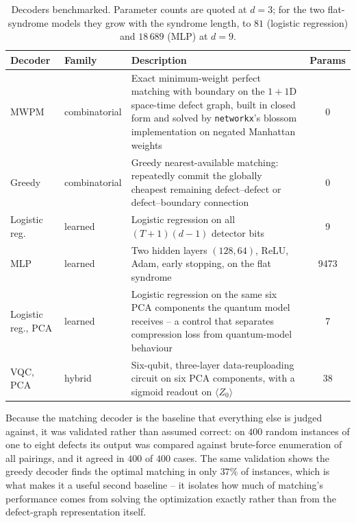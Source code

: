 \documentclass[Thesis.tex]{subfiles}
\begin{document}
\begin{table}[htbp]
\centering
\caption[Decoders benchmarked]{Decoders benchmarked. Parameter counts are quoted at $d = 3$; for the two
flat-syndrome models they grow with the syndrome length, to $81$ (logistic
regression) and $18\,689$ (MLP) at $d = 9$.}
\label{tab:ch6_decoders}
\small
\begin{tabular}{>{\raggedright\arraybackslash}p{2.6cm} >{\raggedright\arraybackslash}p{2.6cm} >{\raggedright\arraybackslash}p{6.7cm} c}
\toprule
\textbf{Decoder} & \textbf{Family} & \textbf{Description} & \textbf{Params} \\
\midrule
MWPM & combinatorial &
Exact minimum-weight perfect matching with boundary on the $1{+}1$D space-time
defect graph, built in closed form and solved by \texttt{networkx}'s blossom
implementation on negated Manhattan weights & 0 \\
\addlinespace
Greedy & combinatorial &
Greedy nearest-available matching: repeatedly commit the globally cheapest remaining
defect--defect or defect--boundary connection & 0 \\
\addlinespace
Logistic reg. & learned &
Logistic regression on all $(T{+}1)(d{-}1)$ detector bits & 9 \\
\addlinespace
MLP & learned &
Two hidden layers $(128, 64)$, ReLU, Adam, early stopping, on the flat syndrome & 9473 \\
\addlinespace
Logistic reg., PCA & learned &
Logistic regression on the same six PCA components the quantum model receives --
a control that separates compression loss from quantum-model behaviour & 7 \\
\addlinespace
VQC, PCA & hybrid &
Six-qubit, three-layer data-reuploading circuit on six PCA components, with a
sigmoid readout on $\langle Z_0 \rangle$ & 38 \\
\bottomrule
\end{tabular}
\end{table}

Because the matching decoder is the baseline that everything else is judged against,
it was validated rather than assumed correct: on $400$ random instances of one to
eight defects its output was compared against brute-force enumeration of all
pairings, and it agreed in $400$ of $400$ cases. The same validation shows the greedy
decoder finds the optimal matching in only $37\%$ of instances, which is what makes
it a useful second baseline -- it isolates how much of matching's performance comes
from solving the optimization exactly rather than from the defect-graph
representation itself.
\end{document}
